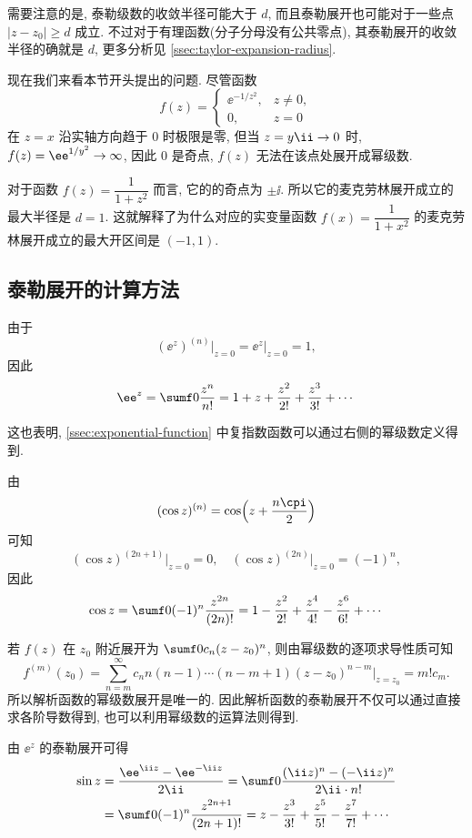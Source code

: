 需要注意的是, 泰勒级数的收敛半径可能大于 $d$, 而且泰勒展开也可能对于一些点 $|z-z_0|\ge d$ 成立.
不过对于有理函数(分子分母没有公共零点), 其泰勒展开的收敛半径的确就是 $d$, 更多分析见 \ref{ssec:taylor-expansion-radius}.

现在我们来看本节开头提出的问题. 尽管函数
\[
  f(z)=\begin{cases}
    \ee^{-1/z^2},&z\neq 0,\\
    0,&z=0
  \end{cases}
\]
在 $z=x$ 沿实轴方向趋于 $0$ 时极限是零, 但当 $z=y\ii\ra0$ 时, $f(z)=\ee^{1/y^2}\ra\infty$, 因此 $0$ 是奇点, $f(z)$ 无法在该点处展开成幂级数.

对于函数 $f(z)=\dfrac1{1+z^2}$ 而言, 它的的奇点为 $\pm\ii$.
所以它的麦克劳林展开成立的最大半径是 $d=1$.
这就解释了为什么对应的实变量函数 $f(x)=\dfrac1{1+x^2}$ 的麦克劳林展开成立的最大开区间是 $(-1,1)$.


\subsection{泰勒展开的计算方法}

\begin{example}
  \label{exam:exp-taylor-expansion}
  由于
  \[
    (\ee^z)^{(n)}\big|_{z=0}=\ee^z\big|_{z=0}=1,
  \]
  因此
  \[
     \ee^z=\sumf0 \frac{z^n}{n!}
    =1+z+\frac{z^2}{2!}+\frac{z^3}{3!}+\cdots
  \]
\end{example}

这也表明, \ref{ssec:exponential-function} 中复指数函数可以通过右侧的幂级数定义得到.

\begin{example}
  由
  \[
    (\cos z)^{(n)}=\cos\Bigl(z+\dfrac{n\cpi}2\Bigr)
  \]
  可知
  \[
    (\cos z)^{(2n+1)}\big|_{z=0}=0,\quad 
    (\cos z)^{(2n)}\big|_{z=0}=(-1)^n,
  \]
  因此
  \[
     \cos z
    =\sumf0 (-1)^n\frac{z^{2n}}{(2n)!}
    =1-\frac{z^2}{2!}+\frac{z^4}{4!}-\frac{z^6}{6!}+\cdots
  \]
\end{example}

若 $f(z)$ 在 $z_0$ 附近展开为 $\sumf0 c_n(z-z_0)^n$,
则由幂级数的逐项求导性质可知
\[
   f^{(m)}(z_0)
  =\sum_{n=m}^\infty c_n n(n-1)\cdots(n-m+1)(z-z_0)^{n-m}
    \Big|_{z=z_0}
  =m!c_m.
\]
所以\alert{解析函数的幂级数展开是唯一的}.
因此解析函数的泰勒展开不仅可以通过直接求各阶导数得到, 也可以\alert{利用幂级数的运算法则得到}.

\begin{example}
  由 $\ee^z$ 的泰勒展开可得
  \begin{align*}
     \sin z&
    =\frac{\ee^{\ii z}-\ee^{-\ii z}}{2\ii}
    =\sumf0 \frac{(\ii z)^n-(-\ii z)^n}{2\ii\cdot n!}\\&
    =\sumf0 (-1)^n\frac{z^{2n+1}}{(2n+1)!}
    =z-\frac{z^3}{3!}+\frac{z^5}{5!}-\frac{z^7}{7!}+\cdots
  \end{align*}
\end{example}

